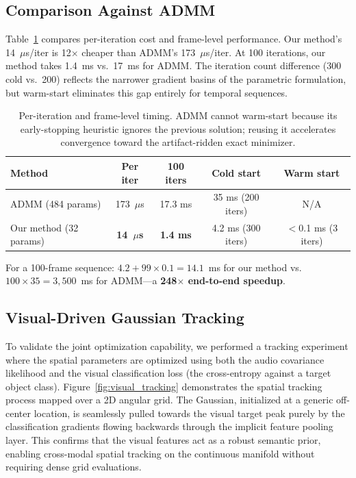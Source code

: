 \documentclass{article}
\begin{document}
\subsection{Comparison Against ADMM}
Table~\ref{tab:comparison} compares per-iteration cost and frame-level performance. Our method's 14~$\mu$s/iter is 12$\times$ cheaper than ADMM's 173~$\mu$s/iter. At 100 iterations, our method takes 1.4~ms vs.\ 17~ms for ADMM. The iteration count difference (300 cold vs.\ 200) reflects the narrower gradient basins of the parametric formulation, but warm-start eliminates this gap entirely for temporal sequences.

\begin{table}[ht]
\centering
\begin{tabular}{lcccc}
\toprule
Method & Per iter & 100 iters & Cold start & Warm start \\
\midrule
ADMM (484 params) & 173~$\mu$s & 17.3 ms & 35 ms (200 iters) & N/A \\
Our method (32 params) & \textbf{14~$\mu$s} & \textbf{1.4 ms} & 4.2 ms (300 iters) & $<$0.1 ms (3 iters) \\
\bottomrule
\end{tabular}
\caption{Per-iteration and frame-level timing. ADMM cannot warm-start because its early-stopping heuristic ignores the previous solution; reusing it accelerates convergence toward the artifact-ridden exact minimizer.}
\label{tab:comparison}
\end{table}

For a 100-frame sequence: $4.2 + 99 \times 0.1 = 14.1$~ms for our method vs.\ $100 \times 35 = 3,500$~ms for ADMM---a \textbf{248$\times$ end-to-end speedup}.


\subsection{Visual-Driven Gaussian Tracking}
To validate the joint optimization capability, we performed a tracking experiment where the spatial parameters are optimized using both the audio covariance likelihood and the visual classification loss (the cross-entropy against a target object class). Figure~\ref{fig:visual_tracking} demonstrates the spatial tracking process mapped over a 2D angular grid. The Gaussian, initialized at a generic off-center location, is seamlessly pulled towards the visual target peak purely by the classification gradients flowing backwards through the implicit feature pooling layer. This confirms that the visual features act as a robust semantic prior, enabling cross-modal spatial tracking on the continuous manifold without requiring dense grid evaluations.
\end{document}
